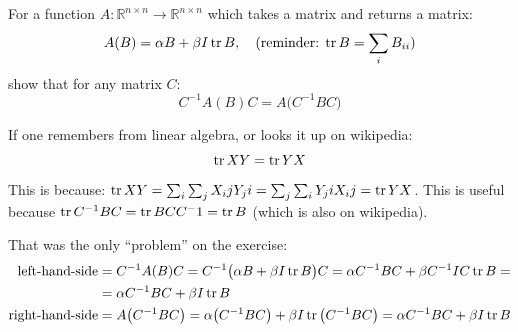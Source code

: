 \documentclass[12pt,class=article,crop=false,preview=false]{standalone}
\begin{document}
\begin{exercise}
For a function $A:\mathbb{R}^{n\times n}\rightarrow\mathbb{R}^{n\times n}$ which takes a matrix and returns a matrix:
\[A(B) = \alpha B + \beta I \operatorname{tr}{B},\quad\text{(reminder: $\operatorname{tr}{B}=\sum_iB_{ii}$)}\]
show that for any matrix $C$:
\[C^{-1}A(B)C = A\big(C^{-1}BC\big)\]
\end{exercise}

\begin{solution}
    If one remembers from linear algebra, or looks it up on wikipedia:
    \[\operatorname{tr} XY = \operatorname{tr} YX\]
    This is because: $\operatorname{tr} XY = \sum_i\sum_j X_ijY_ji = \sum_j\sum_i Y_jiX_ij = \operatorname{tr} YX$. This is useful because $\operatorname{tr} {C^{-1}BC} = \operatorname{tr} {BCC^-1} = \operatorname{tr} B$ (which is also on wikipedia).

    
    That was the only ``problem'' on the exercise:
    \begin{align*}
    \text{left-hand-side} &= C^{-1}A(B)C = C^{-1}\big(\alpha B + \beta I \operatorname{tr}{B}\big)C
     = \alpha C^{-1}BC + \beta C^{-1}IC \operatorname{tr}{B}=\\&= \alpha C^{-1}BC + \beta I \operatorname{tr}{B}\\
    \text{right-hand-side} &= A\big(C^{-1}BC\big) = \alpha \big(C^{-1}BC\big) + \beta I \operatorname{tr}\big(C^{-1}BC\big) = \alpha C^{-1} B C + \beta I \operatorname{tr} B
    \end{align*}
\end{solution}
\end{document}
